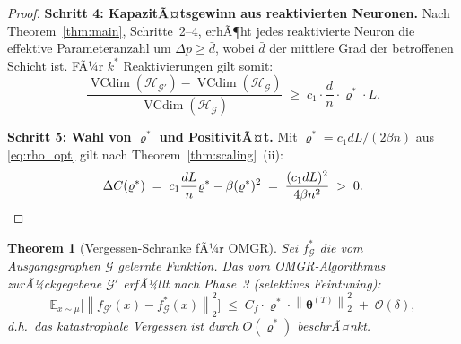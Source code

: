 ﻿\documentclass[12pt, a4paper, openany]{report}
\newtheorem{theorem}{Theorem}[chapter]
\newcommand{\E}{\mathbb{E}}
\newcommand{\calG}{\mathcal{G}}
\newcommand{\calH}{\mathcal{H}}
\newcommand{\norms}[1]{\left\|#1\right\|}
\DeclareMathOperator{\VC}{VCdim}
\begin{document}
\begin{proof}
\textbf{Schritt 4: KapazitÃ¤tsgewinn aus reaktivierten Neuronen.}
Nach Theorem~\ref{thm:main}, Schritte~2--4, erhÃ¶ht jedes reaktivierte
Neuron die effektive Parameteranzahl um $\Delta p \geq \bar{d}$,
wobei $\bar{d}$ der mittlere Grad der betroffenen Schicht ist.
FÃ¼r $k^*$ Reaktivierungen gilt somit:
\[
  \frac{\VC(\calH_{\calG'}) - \VC(\calH_{\calG})}{\VC(\calH_{\calG})}
  \;\geq\;
  c_1 \cdot \frac{d}{n} \cdot \varrho^* \cdot L.
\]

\textbf{Schritt 5: Wahl von $\varrho^*$ und PositivitÃ¤t.}
Mit $\varrho^* = c_1 d L / (2\beta n)$ aus \eqref{eq:rho_opt} gilt nach
Theorem~\ref{thm:scaling}~(ii):
\[
  \Delta C(\varrho^*) \;=\;
  c_1 \frac{dL}{n} \varrho^* - \beta (\varrho^*)^2
  \;=\; \frac{(c_1 dL)^2}{4\beta n^2} \;>\; 0. \qedhere
\]
\end{proof}

\begin{theorem}[Vergessen-Schranke fÃ¼r OMGR]
\label{thm:omgr_forgetting}
Sei $f^*_\calG$ die vom Ausgangsgraphen $\calG$ gelernte Funktion.
Das vom OMGR-Algorithmus zurÃ¼ckgegebene $\calG'$ erfÃ¼llt nach
Phase~3 (selektives Feintuning):
\begin{equation}
  \label{eq:omgr_forgetting}
  \E_{x \sim \mu}\!\bigl[\norms{f_{\calG'}(x) - f^*_\calG(x)}_2^2\bigr]
  \;\leq\;
  C_f \cdot \varrho^* \cdot \norms{\bm{\theta}^{(T)}}_2^2
  \;+\; \mathcal{O}(\delta),
\end{equation}
d.h.\ das katastrophale Vergessen ist durch $O(\varrho^*)$ beschrÃ¤nkt.
\end{theorem}
\end{document}
